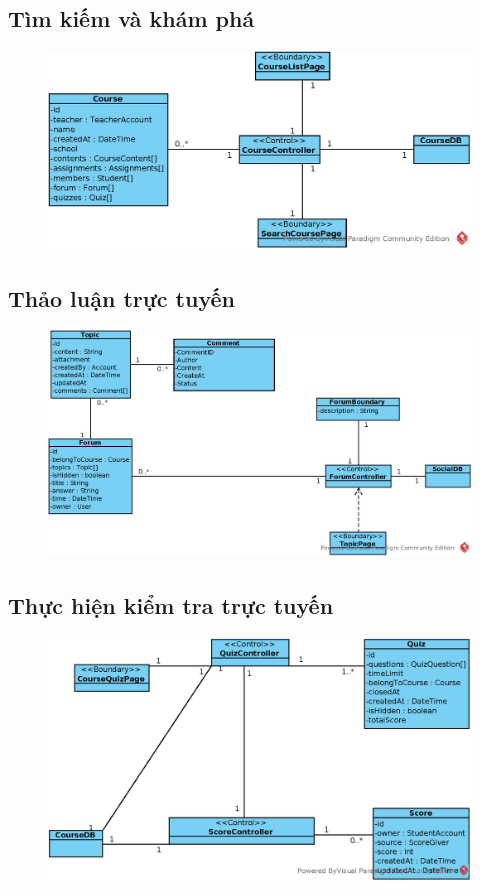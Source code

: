 \documentclass[./../main_file.tex]{subfiles}
\begin{document}
\subsection{Tìm kiếm và khám phá}
\begin{figure}[H]
	\centering
	\includegraphics[width=\linewidth]{./images/define_attribute/ucd_atr_search_course.eps}
\end{figure}
\subsection{Thảo luận trực tuyến}
\begin{figure}[H]
	\centering
	\includegraphics[width=\linewidth]{./images/define_attribute/ucd_atr_forum_discussion.eps}
\end{figure}
\subsection{Thực hiện kiểm tra trực tuyến}
\begin{figure}[H]
	\centering
	\includegraphics[width=\linewidth]{./images/define_attribute/ucd_at_per_take_test.eps}
\end{figure}
\end{document}
